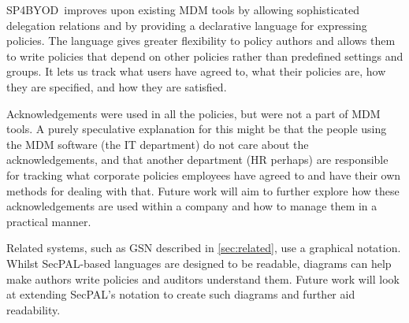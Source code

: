 \documentclass{llncs}
\newcommand{\AppPAL}[0]{SP4BYOD}
\begin{document}
\AppPAL~improves upon existing MDM tools by allowing sophisticated delegation relations and by providing a declarative language for expressing policies.
The language gives greater flexibility to policy authors and allows them to write policies that depend on other policies rather than predefined settings and groups.
It lets us track what users have agreed to, what their policies are, how they are specified, and how they are satisfied.

Acknowledgements were used in all the policies, but were not a part of \ac{MDM} tools.
A purely speculative explanation for this might be that the people using the \ac{MDM} software (the IT department) do not care about the acknowledgements, and that another department (HR perhaps) are responsible for tracking what corporate policies employees have agreed to and have their own methods for dealing with that.
Future work will aim to further explore how these acknowledgements are used within a company and how to manage them in a practical manner.

Related systems, such as \ac{GSN} described in \autoref{sec:related}, use a graphical notation.
Whilst SecPAL-based languages are designed to be readable, diagrams can help make authors write policies and auditors understand them.
Future work will look at extending SecPAL's notation to create such diagrams and further aid readability.


%
\newpage
\printbibliography
\end{document}
